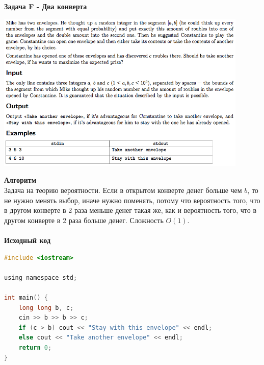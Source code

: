 \documentclass[a4paper,12pt]{article}
\begin{document}
\newpage
\textbf{{\large Задача F - Два конверта}} \\
\begin{center}
\includegraphics[width=0.9\textwidth]{CT_SGAU/CT_SGAU_F.png}\\ [1cm]
\end{center}
\textbf{{\large Алгоритм}} \\
Задача на теорию вероятности. Если в открытом конверте денег больше чем $b$, то не нужно менять выбор, иначе нужно поменять, потому что вероятность того, что в другом конверте в 2 раза меньше денег такая же, как и вероятность того, что в другом конверте в 2 раза больше денег. Сложность $O(1)$.\\ 
\\
\textbf{{\large Исходный код}}
\begin{lstlisting}[language=C]
#include <iostream>

using namespace std;

int main() {
    long long b, c;
    cin >> b >> b >> c;
    if (c > b) cout << "Stay with this envelope" << endl;
    else cout << "Take another envelope" << endl;
    return 0;
}
\end{lstlisting}
\end{document}
